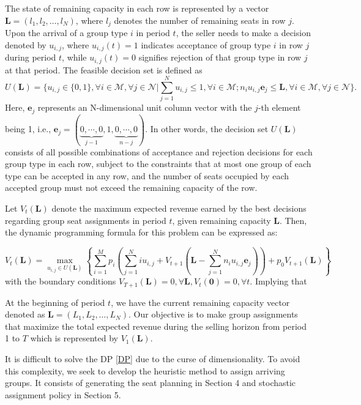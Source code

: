 The state of remaining capacity in each row is represented by a vector $\mathbf{L} = (l_1, l_2, \ldots, l_N)$, where $l_j$ denotes the number of remaining seats in row $j$. Upon the arrival of a group type $i$ in period $t$, the seller needs to make a decision denoted by $u_{i,j}$, where $u_{i,j}(t) = 1$ indicates acceptance of group type $i$ in row $j$ during period $t$, while $u_{i,j}(t) = 0$ signifies rejection of that group type in row $j$ at that period. The feasible decision set is defined as $$U(\mathbf{L}) = \{u_{i,j} \in \{0,1\}, \forall i \in \mathcal{M}, \forall j \in \mathcal{N} | \sum_{j=1}^{N} u_{i,j} \leq 1, \forall i \in \mathcal{M}; n_{i}u_{i,j}\mathbf{e}_j \leq \mathbf{L}, \forall i \in \mathcal{M}, \forall j \in \mathcal{N}\}.$$ Here, $\mathbf{e}_j$ represents an N-dimensional unit column vector with the $j$-th element being 1, i.e., $\mathbf{e}_j = (\underbrace{0, \cdots, 0}_{j-1}, 1, \underbrace{0, \cdots, 0}_{n-j})$. In other words, the decision set $U(\mathbf{L})$ consists of all possible combinations of acceptance and rejection decisions for each group type in each row, subject to the constraints that at most one group of each type can be accepted in any row, and the number of seats occupied by each accepted group must not exceed the remaining capacity of the row.


Let $V_t(\mathbf{L})$ denote the maximum expected revenue earned by the best decisions regarding group seat assignments in period $t$, given remaining capacity $\mathbf{L}$. Then, the dynamic programming formula for this problem can be expressed as:

\begin{equation}\label{DP}
V_{t}(\mathbf{L}) = \max_{u_{i,j} \in U(\mathbf{L})}\left\{ \sum_{i=1}^{M} p_i ( \sum_{j=1}^{N} i u_{i,j} + V_{t+1}(\mathbf{L}- \sum_{j=1}^{N} n_i u_{i,j}\mathbf{e}_j)) + p_0 V_{t+1}(\mathbf{L})\right\}
\end{equation}
with the boundary conditions $V_{T+1}(\mathbf{L}) = 0, \forall \mathbf{L}, V_{t}(\mathbf{0}) =0, \forall t$. Implying that 

At the beginning of period $t$, we have the current remaining capacity vector denoted as $\mathbf{L} = (L_1, L_2, \ldots, L_N)$. Our objective is to make group assignments that maximize the total expected revenue during the selling horizon from period 1 to $T$ which is represented by $V_1(\mathbf{L})$.

It is difficult to solve the DP \eqref{DP} due to the curse of dimensionality. To avoid this complexity, we seek to develop the heuristic method to assign arriving groups. It consists of generating the seat planning in Section 4 and stochastic assignment policy in Section 5.

